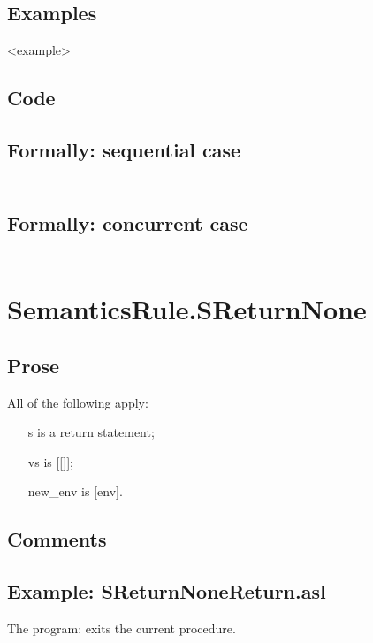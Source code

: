 \documentclass{book}
\begin{document}
    \subsection{Examples}
    <example>

  \subsection{Code}

  \subsection{Formally: sequential case}
  \begin{align}
  \end{align} 

  \subsection{Formally: concurrent case}
  \begin{align}
  \end{align} 

\section{SemanticsRule.SReturnNone \label{sec:SemanticsRule.SReturnNone}}

    \subsection{Prose}
    All of the following apply:
    \begin{itemize}
    \item [s] is a return statement;
    \item [vs] is [[]];
    \item [new\_env] is [env].
    \end{itemize}

    \subsection{Comments}

    \subsection{Example: SReturnNoneReturn.asl}
    The program:
    exits the current procedure.
\end{document}
